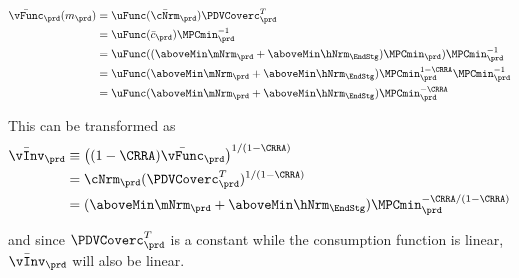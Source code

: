 \documentclass[titlepage, headings=optiontotocandhead]{econark}
\begin{document}
  \begin{equation}\begin{gathered}\begin{aligned}
        \bar{\vFunc}_{\prd}(m_{\prd})  & = \uFunc(\bar{\cNrm}_{\prd})\PDVCoverc_{\prd}^{T}\label{eq:vFuncPF}
        \\  & = \uFunc(\bar{c}_{\prd}) \MPCmin_{\prd}^{-1} %
        \\  & = \uFunc((\aboveMin \mNrm_{\prd}+\aboveMin \hNrm_{\EndStg})\MPCmin_{\prd}) \MPCmin_{\prd}^{-1} %
        \\  & = \uFunc(\aboveMin \mNrm_{\prd}+\aboveMin \hNrm_{\EndStg})\MPCmin_{\prd}^{1-\CRRA} \MPCmin_{\prd}^{-1} %
        \\  & = \uFunc(\aboveMin \mNrm_{\prd}+\aboveMin \hNrm_{\EndStg})\MPCmin_{\prd}^{-\CRRA}  %
      \end{aligned}\end{gathered}\end{equation}

  This can be transformed as
  \begin{equation*}\begin{gathered}\begin{aligned}
        \bar{\vInv}_{\prd}  & \equiv  \left((1-\CRRA)\bar{\vFunc}_{\prd}\right)^{1/(1-\CRRA)}
        \\  & = \cNrm_{\prd}(\PDVCoverc_{\prd}^{T})^{1/(1-\CRRA)}
        \\  & = (\aboveMin \mNrm_{\prd}+\aboveMin \hNrm_{\EndStg})\MPCmin_{\prd}^{-\CRRA/(1-\CRRA)}   %
      \end{aligned}\end{gathered}\end{equation*}


  and since $\PDVCoverc_{\prd}^{T}$ is a constant while the consumption
  function is linear, $\bar{\vInv}_{\prd}$ will also be linear.
\end{document}
